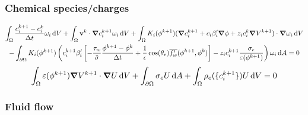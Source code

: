 \documentclass[preprint,pre,superscriptaddress,a4paper]{revtex4-1}
\renewcommand{\v}[1]{\ensuremath{\mathbf{#1}}} %
\newcommand{\gv}[1]{\ensuremath{\mbox{\boldmath$ #1 $}}}
\newcommand{\diff}{\mathrm{d}}
\newcommand{\grad}[1]{\gv{\nabla} #1} %
\begin{document}
\subsubsection{Chemical species/charges}
\begin{multline}
  \int_\Omega \frac{c_i^{k+1}-c_i^k}{\Delta t} \omega_i \, \diff V + \int_\Omega \v v^k \cdot \grad c_i^{k+1} \omega_i \, \diff V 
  + \int_\Omega  K_i(\phi^{k+1}) (\grad c_i^{k+1} + c_i \beta_i' \grad\phi  + z_i c_i^{k} \grad V^{k+1} ) \cdot \grad \omega_i \, \diff V \\
  - \int_{\partial\Omega} K_i(\phi^{k+1}) \left( c_i^{k+1} \beta_i' \left[- \frac{\tau_w}{\tilde\sigma}  \frac{\phi^{k+1}-\phi^k}{\Delta t}  + \frac{1}{\epsilon}\cos(\theta_e) \overline{f_w'}(\phi^{k+1}, \phi^{k}) \right] - z_i c_i^{k+1} \frac{\sigma_e}{\varepsilon(\phi^{k+1})} \right) \omega_i  \, \diff A = 0
\end{multline}
\begin{equation}
  \int_\Omega \varepsilon(\phi^{k+1}) \grad V^{k+1} \cdot \grad U \, \diff V
  + \int_{\partial\Omega} \sigma_e  U \, \diff A
  + \int_\Omega  \rho_e(\{c_i^{k+1}\}) U \, \diff V = 0
\end{equation}

\subsubsection{Fluid flow}
\end{document}
